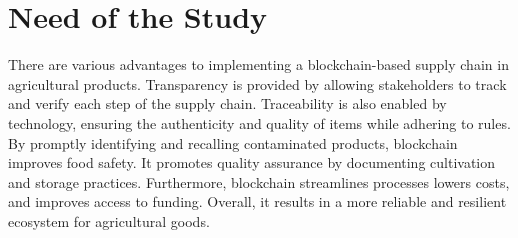 
\section{Need of the Study}
\noindent There are various advantages to implementing a blockchain-based supply chain in agricultural products. Transparency is provided 
by allowing stakeholders to track and verify each step of the supply chain. Traceability is also enabled by technology, ensuring the 
authenticity and quality of items while adhering to rules. By promptly identifying and recalling contaminated products, blockchain 
improves food safety. It promotes quality assurance by documenting cultivation and storage practices. Furthermore, blockchain 
streamlines processes lowers costs, and improves access to funding. Overall, it results in a more reliable and resilient 
ecosystem for agricultural goods.
